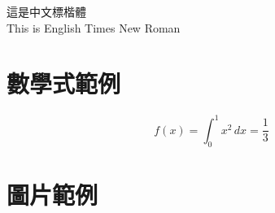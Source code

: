 \documentclass[a4paper,12pt]{article}
\begin{document}
	
	這是中文標楷體\\
	This is English Times New Roman
	
	\section*{數學式範例}
	\[
	f(x) = \int_0^1 x^2 \, dx = \frac{1}{3}
	\]
	
	\section*{圖片範例}
	
\end{document}
